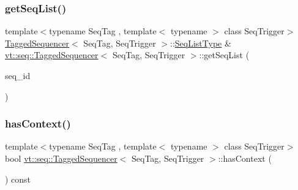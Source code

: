 \mbox{\label{structvt_1_1seq_1_1_tagged_sequencer_aec7c3335594a2bb789258b04fd28e5a1}} 
\subsubsection{\texorpdfstring{get\+Seq\+List()}{getSeqList()}}
{\footnotesize\ttfamily template$<$typename Seq\+Tag , template$<$ typename $>$ class Seq\+Trigger$>$ \\
\hyperlink{structvt_1_1seq_1_1_tagged_sequencer}{Tagged\+Sequencer}$<$ Seq\+Tag, Seq\+Trigger $>$\+::\hyperlink{structvt_1_1seq_1_1_tagged_sequencer_a8df6e02cdb7c2b38870f7ee7776f6f9c}{Seq\+List\+Type} \& \hyperlink{structvt_1_1seq_1_1_tagged_sequencer}{vt\+::seq\+::\+Tagged\+Sequencer}$<$ Seq\+Tag, Seq\+Trigger $>$\+::get\+Seq\+List (\begin{DoxyParamCaption}\item[{\hyperlink{structvt_1_1seq_1_1_tagged_sequencer_a1c8ee839258d0f88c49ef660267a81d5}{Seq\+Type} const \&}]{seq\+\_\+id }\end{DoxyParamCaption})\hspace{0.3cm}{\ttfamily [private]}}

\mbox{\label{structvt_1_1seq_1_1_tagged_sequencer_a5b09f5b9a741dc336f7e5b63223d2ef2}} 
\subsubsection{\texorpdfstring{has\+Context()}{hasContext()}}
{\footnotesize\ttfamily template$<$typename Seq\+Tag , template$<$ typename $>$ class Seq\+Trigger$>$ \\
bool \hyperlink{structvt_1_1seq_1_1_tagged_sequencer}{vt\+::seq\+::\+Tagged\+Sequencer}$<$ Seq\+Tag, Seq\+Trigger $>$\+::has\+Context (\begin{DoxyParamCaption}{ }\end{DoxyParamCaption}) const}

\mbox{\label{structvt_1_1seq_1_1_tagged_sequencer_a73854cf66eef3d55c5ecaa9fc21ec8a2}} 
